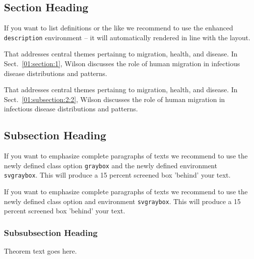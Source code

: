 \begin{bibunit}
	\section{Section Heading}\label{01:section:3}
	
	
	If you want to list definitions or the like we recommend to use the enhanced \verb|description| environment -- it will automatically rendered in line with the layout.
	
	\begin{description}[Type 1]
		\item[Type 1]{That addresses central themes pertainng to migration, health, and disease. In Sect.~\ref{01:section:1}, Wilson discusses the role of human migration in infectious disease distributions and patterns.}
		\item[Type 2]{That addresses central themes pertainng to migration, health, and disease. In Sect.~\ref{01:subsection:2:2}, Wilson discusses the role of human migration in infectious disease distributions and patterns.}
	\end{description}
	
	\subsection{Subsection Heading}\label{01:subsection:3:1}
	
	\lipsum
	
	\begin{svgraybox}
		If you want to emphasize complete paragraphs of texts we recommend to use the newly defined class option \verb|graybox| and the newly defined environment \verb|svgraybox|. This will produce a 15 percent screened box 'behind' your text.
		
		If you want to emphasize complete paragraphs of texts we recommend to use the newly defined class option and environment \verb|svgraybox|. This will produce a 15 percent screened box 'behind' your text.
	\end{svgraybox}
	
	
	\subsubsection{Subsubsection Heading}\label{01:subsubsection:3:1:1}
	
	\begin{theorem}
		Theorem text goes here.
	\end{theorem}
	

\end{bibunit}
